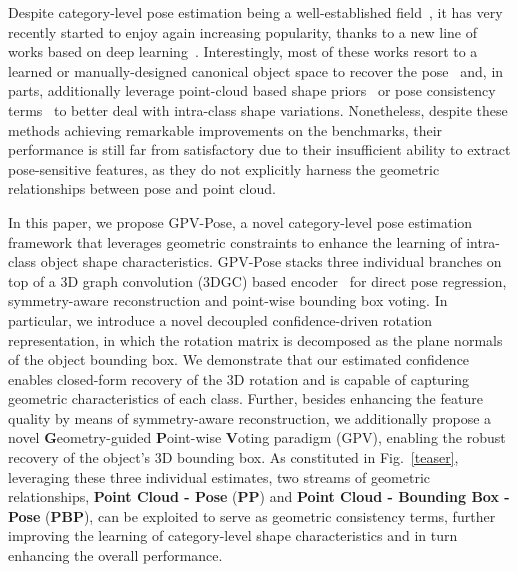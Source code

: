 \documentclass[10pt,twocolumn,letterpaper]{article}
\begin{document}
Despite category-level pose estimation being a well-established field~\cite{lopez2011deformable,ozuysal2009pose, savarese20073d}, it has very recently started to enjoy again increasing popularity, thanks to a new line of works based on deep learning~\cite{NOCS,cass,shape_deform}. 
Interestingly, most of these works resort to a learned or manually-designed canonical object space to recover the pose~\cite{NOCS, cass} and, in parts, additionally leverage point-cloud based shape priors~\cite{shape_deform,sgpa} or pose consistency terms~\cite{dualposenet} to better deal with intra-class shape variations. Nonetheless, despite these methods achieving remarkable improvements on the benchmarks, their performance is still far from satisfactory due to their insufficient ability to extract pose-sensitive features, as they do not explicitly harness the geometric relationships between pose and point cloud.


In this paper, we propose GPV-Pose, a novel category-level pose estimation framework that leverages geometric constraints to enhance the learning of intra-class object shape characteristics.
GPV-Pose stacks three individual branches on top of a 3D graph convolution (3DGC) based encoder~\cite{3DGC, fs-net} for direct pose regression, symmetry-aware reconstruction and point-wise bounding box voting. 
In particular, we introduce a novel decoupled confidence-driven rotation representation, in which the rotation matrix is decomposed as the plane normals of the object bounding box.
We demonstrate that our estimated confidence enables closed-form recovery of the 3D rotation and is capable of capturing geometric characteristics of each class. Further, besides enhancing the feature quality by means of symmetry-aware reconstruction, we additionally propose a novel \textbf{G}eometry-guided \textbf{P}oint-wise \textbf{V}oting paradigm (GPV), enabling the robust recovery of the object's 3D bounding box.
As constituted in Fig.~\ref{teaser}, leveraging these three individual estimates, two streams of geometric relationships, \ie \textbf{Point Cloud - Pose} (\textbf{PP}) and \textbf{Point Cloud - Bounding Box - Pose} (\textbf{PBP}), can be exploited to serve as geometric consistency terms, further improving the learning of category-level shape characteristics and in turn enhancing the overall performance.
\end{document}
